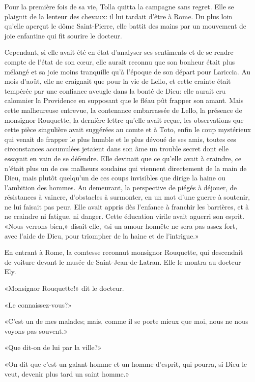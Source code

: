 
Pour la première fois de sa vie, Tolla quitta la campagne sans regret.
Elle se plaignit de la lenteur des chevaux: il lui tardait d'être à
Rome. Du plus loin qu'elle aperçut le dôme Saint-Pierre, elle battit des
mains par un mouvement de joie enfantine qui fit sourire le docteur.

Cependant, si elle avait été en état d'analyser ses sentiments et de se
rendre compte de l'état de son cœur, elle aurait reconnu que son bonheur
était plus mélangé et sa joie moins tranquille qu'à l'époque de son
départ pour Lariccia. Au mois d'août, elle ne craignait que pour la vie
de Lello, et cette crainte était tempérée par une confiance aveugle dans
la bonté de Dieu: elle aurait cru calomnier la Providence en supposant
que le fléau pût frapper son amant. Mais cette malheureuse entrevue, la
contenance embarrassée de Lello, la présence de monsignor Rouquette, la
dernière lettre qu'elle avait reçue, les observations que cette pièce
singulière avait suggérées au comte et à Toto, enfin le coup mystérieux
qui venait de frapper le plus humble et le plus dévoué de ses amis,
toutes ces circonstances accumulées jetaient dans son âme un trouble
secret dont elle essayait en vain de se défendre. Elle devinait que ce
qu'elle avait à craindre, ce n'était plus un de ces malheurs soudains
qui viennent directement de la main de Dieu, mais plutôt quelqu'un de
ces coups invisibles que dirige la haine ou l'ambition des hommes. Au
demeurant, la perspective de piégés à déjouer, de résistances à vaincre,
d'obstacles à surmonter, en un mot d'une guerre à soutenir, ne lui
faisait pas peur. Elle avait appris dès l'enfance à franchir les
barrières, et à ne craindre ni fatigue, ni danger. Cette éducation
virile avait aguerri son esprit. «Nous verrons bien,» disait-elle, «si
un amour honnête ne sera pas assez fort, avec l'aide de Dieu, pour
triompher de la haine et de l'intrigue.»

En entrant à Rome, la comtesse reconnut monsignor Rouquette, qui
descendait de voiture devant le musée de Saint-Jean-de-Latran. Elle le
montra au docteur Ely.

«Monsignor Rouquette!» dit le docteur.

«Le connaissez-vous?»

«C'est un de mes malades; mais, comme il se porte mieux que moi, nous ne
nous voyons pas souvent.»

«Que dit-on de lui par la ville?»

«On dit que c'est un galant homme et un homme d'esprit, qui pourra, si
Dieu le veut, devenir plus tard un saint homme.»

